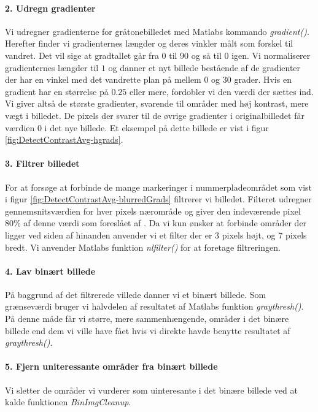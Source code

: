 \paragraph{2. Udregn gradienter}
Vi udregner gradienterne for gråtonebilledet med Matlabs kommando \textit{gradient()}. Herefter finder vi gradienternes længder og deres vinkler målt som forskel til vandret. Det vil sige at gradtallet går fra 0 til 90 og så til 0 igen. Vi normaliserer gradienternes længder til $1$ og danner et nyt billede bestående af de gradienter der har en vinkel med det vandrette plan på mellem $0$ og $30$ grader. Hvis en gradient har en størrelse på $0.25$ eller mere, fordobler vi den værdi der sættes ind. Vi giver altså de største gradienter, svarende til områder med høj kontrast, mere vægt i billedet. De pixels der svarer til de øvrige gradienter i originalbilledet får værdien $0$ i det nye billede. Et eksempel på dette billede er vist i figur \vref{fig:DetectContrastAvg-hgrads}.

\paragraph{3. Filtrer billedet}
For at forsøge at forbinde de mange markeringer i nummerpladeområdet som vist i figur \vref{fig:DetectContrastAvg-blurredGrads} filtrerer vi billedet. Filteret udregner gennemsnitsværdien for hver pixels nærområde og giver den indeværende pixel 80\% af denne værdi som foreslået af \cite{shapiro}. Da vi kun ønsker at forbinde områder der ligger ved siden af hinanden anvender vi et filter der er 3 pixels højt, og 7 pixels bredt. Vi anvender Matlabs funktion \textit{nlfilter()} for at foretage filtreringen.

\paragraph{4. Lav binært billede}
På baggrund af det filtrerede villede danner vi et binært billede. Som grænseværdi bruger vi halvdelen af resultatet af Matlabs funktion \textit{graythresh()}. På denne måde får vi større, mere sammenhængende, områder i det binære billede end dem vi ville have fået hvis vi direkte havde benytte resultatet af \textit{graythresh()}.

\paragraph{5. Fjern uniteressante områder fra binært billede}
Vi sletter de områder vi vurderer som uinteresante i det binære billede ved at kalde funktionen \textit{BinImgCleanup}.

